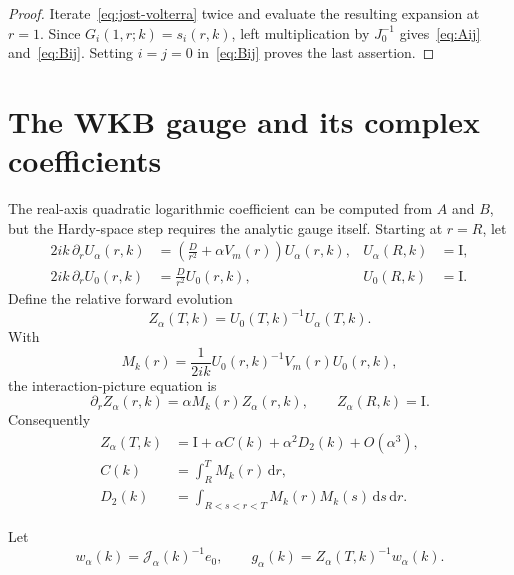 \documentclass[11pt]{article}
\newcommand{\Id}{\mathrm I}
\newcommand{\dd}{\,\mathrm d}
\newcommand{\cJ}{\mathcal J}
\theoremstyle{definition}
\begin{document}
\begin{proof}
Iterate~\eqref{eq:jost-volterra} twice and evaluate the resulting expansion at $r=1$.  Since $G_i(1,r;k)=s_i(r,k)$, left multiplication by $J_0^{-1}$ gives~\eqref{eq:Aij} and~\eqref{eq:Bij}.  Setting $i=j=0$ in~\eqref{eq:Bij} proves the last assertion.
\end{proof}

\section{The WKB gauge and its complex coefficients}

The real-axis quadratic logarithmic coefficient can be computed from $A$ and $B$, but the Hardy-space step requires the analytic gauge itself.  Starting at $r=R$, let
\begin{align}
 2ik\,\partial_rU_\alpha(r,k)
 &=\left(\frac{D}{r^2}+\alpha V_m(r)\right)U_\alpha(r,k),
 &U_\alpha(R,k)&=\Id,\label{eq:forward-U}\\
 2ik\,\partial_rU_0(r,k)
 &=\frac{D}{r^2}U_0(r,k),
 &U_0(R,k)&=\Id.
\end{align}
Define the relative forward evolution
\begin{equation}
 Z_\alpha(T,k)=U_0(T,k)^{-1}U_\alpha(T,k).
\end{equation}
With
\begin{equation}
 M_k(r)=\frac1{2ik}U_0(r,k)^{-1}V_m(r)U_0(r,k),
 \label{eq:interaction-M}
\end{equation}
the interaction-picture equation is
\begin{equation}
 \partial_rZ_\alpha(r,k)=\alpha M_k(r)Z_\alpha(r,k),
 \qquad Z_\alpha(R,k)=\Id.
\end{equation}
Consequently
\begin{align}
 Z_\alpha(T,k)
 &=\Id+\alpha C(k)+\alpha^2D_2(k)+O(\alpha^3),\label{eq:Z-expansion}\\
 C(k)&=\int_R^T M_k(r)\dd r,\label{eq:C}\\
 D_2(k)&=\int_{R<s<r<T}M_k(r)M_k(s)\dd s\dd r.
 \label{eq:D2}
\end{align}

Let
\begin{equation}
 w_\alpha(k)=\cJ_\alpha(k)^{-1}e_0,
 \qquad
 g_\alpha(k)=Z_\alpha(T,k)^{-1}w_\alpha(k).
 \label{eq:gauged-column}
\end{equation}
\end{document}

